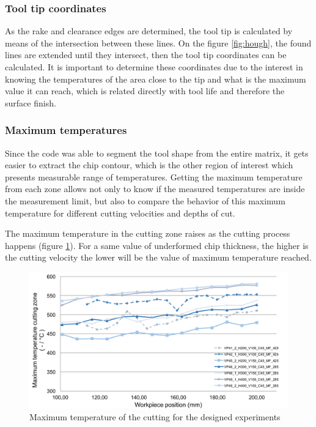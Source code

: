 		\subsubsection{Tool tip coordinates}

			As the rake and clearance edges are determined, the tool tip is calculated by means of the intersection between these lines. On the figure \ref{fig:hough}, the found lines are extended until they intersect, then the tool tip coordinates can be calculated. It is important to determine these coordinates due to the interest in knowing the temperatures of the area close to the tip and what is the maximum value it can reach, which is related directly with tool life and therefore the surface finish.

		\subsubsection{Maximum temperatures}

			Since the code was able to segment the tool shape from the entire matrix, it gets easier to extract the chip contour, which is the other region of interest which presents measurable range of temperatures. Getting the maximum temperature from each zone allows not only to know if the measured temperatures are inside the measurement limit, but also to compare the behavior of this maximum temperature for different cutting velocities and depths of cut.

			The maximum temperature in the cutting zone raises as the cutting process happens (figure \ref{fig:maxtemp}). For a same value of underformed chip thickness, the higher is the cutting velocity the lower will be the value of maximum temperature reached.

			\begin{figure}[H]
			\centering
			\captionsetup{justification=centering}
			\includegraphics[scale = 0.55]{Imagens/maxtemp.png}
			\caption{Maximum temperature of the cutting for the designed experiments}
			\label{fig:maxtemp}
			\end{figure}

